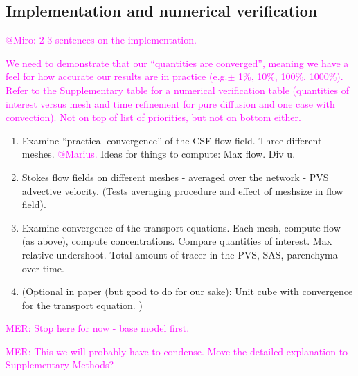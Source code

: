 \documentclass[fleqn,10pt]{wlscirep}
\newcommand{\mer}[1]{\textcolor{magenta}{#1}}
\begin{document}
\subsection*{Implementation and numerical verification}

\mer{@Miro: 2-3 sentences on the implementation.}

\mer{We need to demonstrate that our ``quantities are converged'', meaning we have a feel for how accurate our results are in practice (e.g.$\pm$ 1\%, 10\%, 100\%, 1000\%). Refer to the Supplementary table for a numerical verification table (quantities of interest versus mesh and time refinement for pure diffusion and one case with convection). Not on top of list of priorities, but not on bottom either.} 

\begin{enumerate}
\item
  Examine ``practical convergence'' of the CSF flow field. Three
  different meshes. \mer{@Marius.} Ideas for things to compute: Max
    flow. Div u.
\item
  Stokes flow fields on different meshes - averaged over the network -
  PVS advective velocity. (Tests averaging procedure and effect of
  meshsize in flow field).
\item
  Examine convergence of the transport equations. Each mesh, compute
  flow (as above), compute concentrations. Compare quantities of
  interest. Max relative undershoot. Total amount of tracer in the
  PVS, SAS, parenchyma over time.
\item
  (Optional in paper (but good to do for our sake): Unit cube with
  convergence for the transport equation. )
\end{enumerate}

\mer{MER: Stop here for now - base model first.}



\mer{MER: This we will probably have to condense. Move the detailed explanation to Supplementary Methods?}
\end{document}

